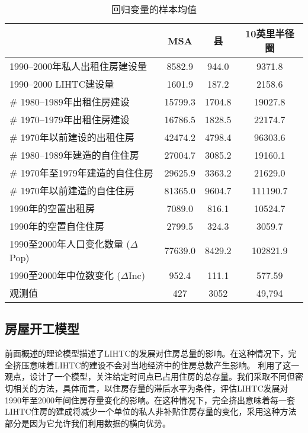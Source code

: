 \documentclass[lang=cn,11pt,a4paper]{paper}
\begin{document}
\renewcommand\arraystretch{1}
\begin{table}[h]
  \centering
  \setlength{\tabcolsep}{6mm}
    \caption{回归变量的样本均值}\label{tab3}
      \begin{tabular}{lccc}
        \toprule
        & \textbf{MSA} & \textbf{县} & \textbf{10英里半径圈} \\
        \midrule
        1990--2000年私人出租住房建设量 & 8582.9 & 944.0 &
        9371.8 \\
        1990--2000 LIHTC建设量  & 1601.9 & 187.2 & 2158.6 \\
        \# 1980--1989年出租住房建设 & 15799.3 & 1704.8 &
        19027.8 \\
        \# 1970--1979年出租住房建设 & 16786.5 & 1828.5 &
        22174.7 \\
        \# 1970年以前建设的出租住房 & 42474.2 & 4798.4 &
        96303.6 \\
        \# 1980--1989年建造的自住住房 & 27004.7 & 3085.2 &
        19160.1 \\
        \# 1970年至1979年建造的自住住房 & 29625.9 & 3363.2 &
        21629.0 \\
        \# 1970年以前建造的自住住房 & 81365.0 & 9604.7
        & 111190.7 \\
        1990年的空置出租房 & 7089.0 & 816.1 & 10524.7 \\
        1990年的空置自住住房 & 2799.5 & 324.3 &
        3059.7 \\
        1990至2000年人口变化数量 ($\Delta$Pop) & 77639.0 & 8429.2 &
        102821.9 \\
        1990至2000年中位数变化 ($\Delta$Inc) & 952.4 & 111.1 &
        577.59 \\
        观测值 & 427 & 3052 & 49,794 \\
        \bottomrule
      \end{tabular}
  \end{table}

\subsection{房屋开工模型}

前面概述的理论模型描述了LIHTC的发展对住房总量的影响。在这种情况下，完全挤压意味着LIHTC的建设不会对当地经济中的住房总数产生影响。\cite{Sinai20052137} 利用了这一观点，设计了一个模型，关注给定时间点已占用住房的总存量。我们采取不同但密切相关的方法，具体而言，以住房存量的滞后水平为条件，评估LIHTC发展对1990年至2000年间住房存量变化的影响。在这种情况下，完全挤出意味着每一套LIHTC住房的建成将减少一个单位的私人非补贴住房存量的变化，采用这种方法部分是因为它允许我们利用数据的横向优势。
\end{document}
